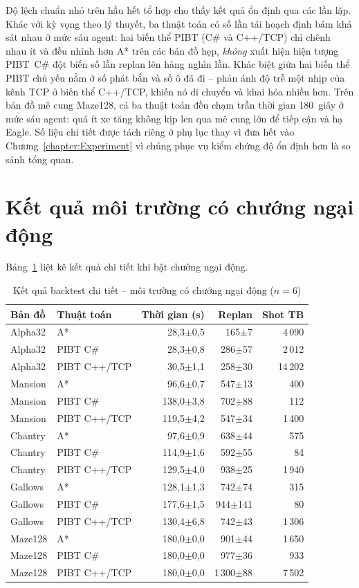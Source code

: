 \documentclass[../DoAn.tex]{subfiles}
\begin{document}
Độ lệch chuẩn nhỏ trên hầu hết tổ hợp cho thấy kết quả ổn định qua các lần lặp. Khác với
kỳ vọng theo lý thuyết, ba thuật toán có số lần tái hoạch định bám khá sát nhau ở mức sáu agent:
hai biến thể PIBT (C\# và C++/TCP) chỉ chênh nhau ít và đều nhỉnh hơn A* trên các
bản đồ hẹp, \emph{không} xuất hiện hiện tượng PIBT~C\# đột biến số lần replan lên hàng nghìn lần.
Khác biệt giữa hai biến thể PIBT chủ yếu nằm ở số phát bắn và số ô
đã đi -- phản ánh độ trễ một nhịp của kênh TCP ở biến thể C++/TCP, khiến nó di chuyển và
khai hỏa nhiều hơn. Trên bản đồ mê cung Maze128, cả ba thuật toán đều chạm trần thời gian
180~giây ở mức sáu agent: quá ít xe tăng không kịp len qua mê cung lớn để tiếp cận và hạ
Eagle. Số liệu chi tiết được tách riêng ở phụ lục thay vì đưa hết vào
Chương~\ref{chapter:Experiment} vì chúng phục vụ kiểm chứng độ ổn định hơn là so sánh tổng
quan.

\section{Kết quả môi trường có chướng ngại động}

Bảng~\ref{tab:appendix_dynamic} liệt kê kết quả chi tiết khi bật chướng ngại động.

\begin{table}[htbp]
\centering
\caption{Kết quả backtest chi tiết -- môi trường có chướng ngại động ($n=6$)}
\label{tab:appendix_dynamic}
\small
\begin{tabular}{|l|l|r|r|r|}
\hline
\textbf{Bản đồ} & \textbf{Thuật toán} & \textbf{Thời gian (s)} & \textbf{Replan} & \textbf{Shot TB} \\ \hline
Alpha32 & A* & 28,3$\pm$0,5 & 165$\pm$7 & 4\,090 \\
Alpha32 & PIBT C\# & 28,3$\pm$0,8 & 286$\pm$57 & 2\,012 \\
Alpha32 & PIBT C++/TCP & 30,5$\pm$1,1 & 258$\pm$30 & 14\,202 \\ \hline
Mansion & A* & 96,6$\pm$0,7 & 547$\pm$13 & 400 \\
Mansion & PIBT C\# & 138,0$\pm$3,8 & 702$\pm$88 & 112 \\
Mansion & PIBT C++/TCP & 119,5$\pm$4,2 & 547$\pm$34 & 1\,400 \\ \hline
Chantry & A* & 97,6$\pm$0,9 & 638$\pm$44 & 575 \\
Chantry & PIBT C\# & 114,9$\pm$1,6 & 592$\pm$55 & 84 \\
Chantry & PIBT C++/TCP & 129,5$\pm$4,0 & 938$\pm$25 & 1\,940 \\ \hline
Gallows & A* & 128,1$\pm$1,3 & 742$\pm$74 & 315 \\
Gallows & PIBT C\# & 177,6$\pm$1,5 & 944$\pm$141 & 80 \\
Gallows & PIBT C++/TCP & 130,4$\pm$6,8 & 742$\pm$43 & 1\,306 \\ \hline
Maze128 & A* & 180,0$\pm$0,0 & 901$\pm$44 & 1\,650 \\
Maze128 & PIBT C\# & 180,0$\pm$0,0 & 977$\pm$36 & 933 \\
Maze128 & PIBT C++/TCP & 180,0$\pm$0,0 & 1\,300$\pm$88 & 7\,502 \\ \hline
\end{tabular}
\end{table}
\end{document}
